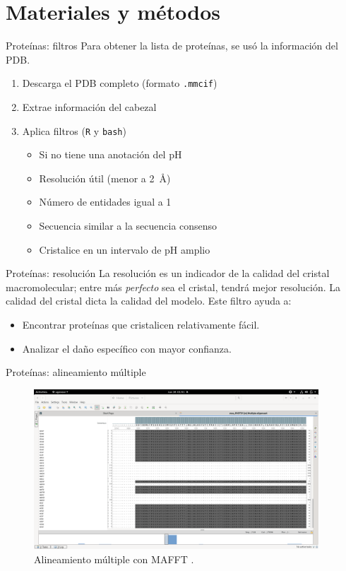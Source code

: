 \documentclass{beamer}
\begin{document}
\section{Materiales y métodos}
\begin{frame}{Proteínas: filtros}
Para obtener la lista de proteínas, se usó la información del PDB.
 \begin{enumerate}
  \item Descarga el PDB completo (formato \texttt{.mmcif})
  \item Extrae información del cabezal
  \item Aplica filtros (\texttt{R} y \texttt{bash})
   \begin{itemize}
    \item Si no tiene una anotación del pH
    \item Resolución útil (menor a \SI{2}{\angstrom})
    \item Número de entidades igual a 1
    \item Secuencia similar a la secuencia consenso
    \item Cristalice en un intervalo de pH amplio
   \end{itemize}
 \end{enumerate}
\end{frame}
\begin{frame}{Proteínas: resolución}
La resolución es un indicador de la calidad del cristal macromolecular; entre más \emph{perfecto} sea el cristal, tendrá mejor resolución. La calidad del cristal dicta la calidad del modelo. Este filtro ayuda a:
 \begin{itemize}
  \item Encontrar proteínas que cristalicen relativamente fácil.
  \item Analizar el daño específico con mayor confianza.
 \end{itemize}
\end{frame}
\begin{frame}{Proteínas: alineamiento múltiple}
 \begin{figure}
   \centering
   \includegraphics[width=0.95\textwidth]{Images/msa_P0DTD1}
   \caption{Alineamiento múltiple con MAFFT \cite{Katoh2013}.}
 \end{figure} 
\end{frame}
\end{document}
